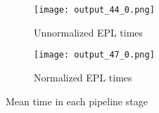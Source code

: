


\begin{figure}
    \centering
    \begin{subfigure}[t]{0.48\textwidth}
        \texttt{[image: output\_44\_0.png]} 
        \caption{Unnormalized EPL times} 
        \label{fig:automation:results:unnorm_epl_times}
    \end{subfigure}
          \begin{subfigure}[t]{0.48\textwidth}
        \centering
        \texttt{[image: output\_47\_0.png]}
        \caption{Normalized EPL times}
        \label{fig:automation:results:norm_epl_timings}
    \end{subfigure}
        \hfill
    \caption{Mean time in each pipeline stage}\label{fig:automation:results:timings}
\end{figure}